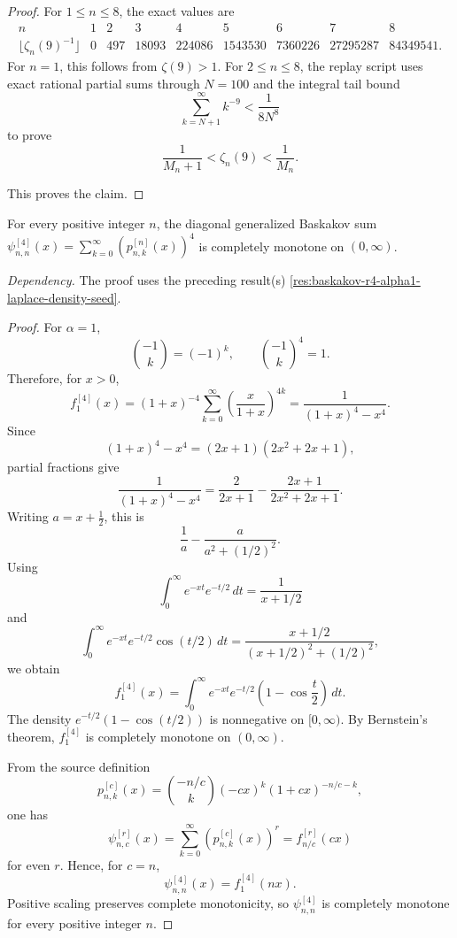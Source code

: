 \begin{proof}
For \(1\le n\le8\), the exact values are
\[
\begin{array}{c|rrrrrrrr}
n&1&2&3&4&5&6&7&8\\
\hline
\lfloor\zeta_n(9)^{-1}\rfloor&0&497&18093&224086&1543530&7360226&27295287&84349541.
\end{array}
\]
For \(n=1\), this follows from \(\zeta(9)>1\). For \(2\le n\le8\), the replay script uses exact rational partial sums through \(N=100\) and the integral tail bound
\[
\sum_{k=N+1}^{\infty}k^{-9}<\frac{1}{8N^8}
\]
to prove
\[
\frac1{M_n+1}<\zeta_n(9)<\frac1{M_n}.
\]

This proves the claim.
\end{proof}

\begin{proposition}
\label{res:baskakov-diagonal-r4-c-equals-n-cm}
For every positive integer \(n\), the diagonal generalized Baskakov sum \(\psi^{[4]}_{n,n}(x)=\sum_{k=0}^{\infty}(p^{[n]}_{n,k}(x))^4\) is completely monotone on \((0,\infty)\).

\emph{Dependency.} The proof uses the preceding result(s) \ref{res:baskakov-r4-alpha1-laplace-density-seed}.
\end{proposition}
\begin{proof}
For \(\alpha=1\),
\[
\binom{-1}{k}=(-1)^k,
\qquad
\binom{-1}{k}^{4}=1.
\]
Therefore, for \(x>0\),
\[
f^{[4]}_1(x)
=(1+x)^{-4}\sum_{k=0}^{\infty}
\left(\frac{x}{1+x}\right)^{4k}
=\frac{1}{(1+x)^4-x^4}.
\]
Since
\[
(1+x)^4-x^4=(2x+1)(2x^2+2x+1),
\]
partial fractions give
\[
\frac{1}{(1+x)^4-x^4}
=\frac{2}{2x+1}-\frac{2x+1}{2x^2+2x+1}.
\]
Writing \(a=x+\frac12\), this is
\[
\frac{1}{a}-\frac{a}{a^2+(1/2)^2}.
\]
Using
\[
\int_0^\infty e^{-xt}e^{-t/2}\,dt=\frac{1}{x+1/2}
\]
and
\[
\int_0^\infty e^{-xt}e^{-t/2}\cos(t/2)\,dt
=\frac{x+1/2}{(x+1/2)^2+(1/2)^2},
\]
we obtain
\[
f^{[4]}_1(x)
=\int_0^\infty e^{-xt}e^{-t/2}\left(1-\cos\frac{t}{2}\right)\,dt.
\]
The density \(e^{-t/2}(1-\cos(t/2))\) is nonnegative on \([0,\infty)\). By Bernstein's theorem, \(f^{[4]}_1\) is completely monotone on \((0,\infty)\).

From the source definition
\[
p^{[c]}_{n,k}(x)=\binom{-n/c}{k}(-cx)^k(1+cx)^{-n/c-k},
\]
one has
\[
\psi^{[r]}_{n,c}(x)=\sum_{k=0}^{\infty}\left(p^{[c]}_{n,k}(x)\right)^r
=f^{[r]}_{n/c}(cx)
\]
for even \(r\). Hence, for \(c=n\),
\[
\psi^{[4]}_{n,n}(x)=f^{[4]}_1(nx).
\]
Positive scaling preserves complete monotonicity, so \(\psi^{[4]}_{n,n}\) is completely monotone for every positive integer \(n\).
\end{proof}

